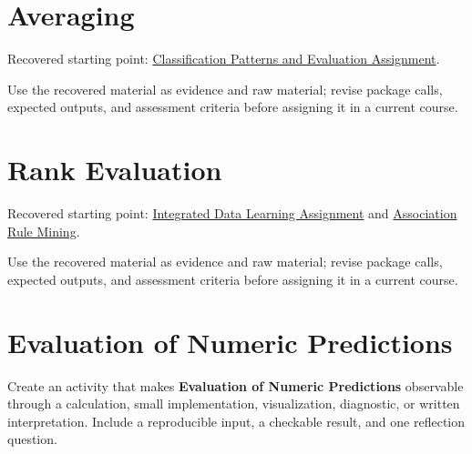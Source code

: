\documentclass[
  letterpaper,
]{scrbook}
\begin{document}
\section*{Averaging}\label{sec-pr-14-averaging}


Recovered starting point:
\hyperref[sec-lab-classification-patterns-assignment]{Classification
Patterns and Evaluation Assignment}.

Use the recovered material as evidence and raw material; revise package
calls, expected outputs, and assessment criteria before assigning it in
a current course.

\section*{Rank Evaluation}\label{sec-pr-14-rank-evaluation}


Recovered starting point:
\hyperref[sec-lab-integrated-learning-assignment]{Integrated Data
Learning Assignment} and
\hyperref[sec-lab-association-rules]{Association Rule Mining}.

Use the recovered material as evidence and raw material; revise package
calls, expected outputs, and assessment criteria before assigning it in
a current course.

\section*{Evaluation of Numeric
Predictions}\label{sec-pr-14-evaluation-of-numeric-predictions}


\begin{tcolorbox}[enhanced jigsaw, arc=.35mm, bottomrule=.15mm, bottomtitle=1mm, breakable, colback=white, colbacktitle=quarto-callout-note-color!10!white, colframe=quarto-callout-note-color-frame, coltitle=black, left=2mm, leftrule=.75mm, opacityback=0, opacitybacktitle=0.6, rightrule=.15mm, title=\textcolor{quarto-callout-note-color}{\faInfo}\hspace{0.5em}{Practice development scaffold}, titlerule=0mm, toprule=.15mm, toptitle=1mm]

Create an activity that makes \textbf{Evaluation of Numeric Predictions}
observable through a calculation, small implementation, visualization,
diagnostic, or written interpretation. Include a reproducible input, a
checkable result, and one reflection question.

\end{tcolorbox}
\end{document}
